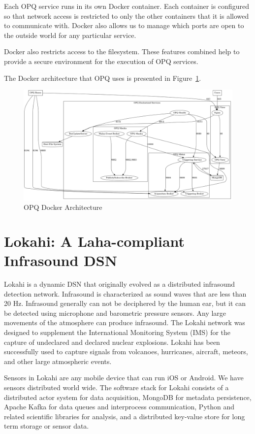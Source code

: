 Each OPQ service runs in its own Docker container. Each container is configured so that network access is restricted to only the other containers that it is allowed to communicate with. Docker also allows us to manage which ports are open to the outside world for any particular service.

Docker also restricts access to the filesystem. These features combined help to provide a secure environment for the execution of OPQ services.

The Docker architecture that OPQ uses is presented in Figure~\ref{fig:docker_deploy}.

\begin{figure}
	\centering
	\includegraphics[width=1\linewidth]{figures/docker_deploy.png}
	\caption{OPQ Docker Architecture}\label{fig:docker_deploy}
\end{figure}

\section{Lokahi: A Laha-compliant Infrasound DSN}\label{sec:lokahi:-a-laha-compliant-infrasound-dsn}
Lokahi is a dynamic DSN that originally evolved as a distributed infrasound detection network. Infrasound is characterized as sound waves that are less than 20 Hz. Infrasound generally can not be deciphered by the human ear, but it can be detected using microphone and barometric pressure sensors. Any large movements of the atmosphere can produce infrasound. The Lokahi network was designed to supplement the International Monitoring System (IMS) for the capture  of undeclared and declared nuclear explosions. Lokahi has been successfully used to capture signals from volcanoes, hurricanes, aircraft, meteors, and other large atmospheric events.

Sensors in Lokahi are any mobile device that can run iOS or Android. We have sensors distributed world wide. The software stack for Lokahi consists of a distributed actor system for data acquisition, MongoDB for metadata persistence, Apache Kafka for data queues and interprocess communication, Python and related scientific libraries for analysis, and a distributed key-value store for long term storage or sensor data.

